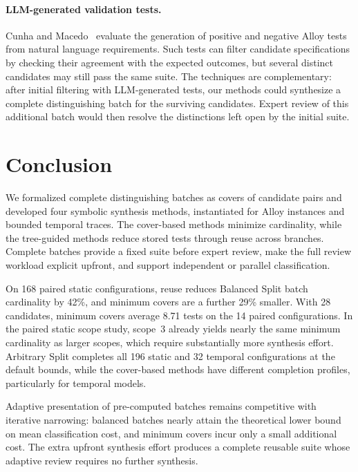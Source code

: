 \documentclass[runningheads]{llncs}
\newcommand{\methodname}[1]{\textup{\textsf{#1}}}
\newcommand{\arbitrarysplit}{\methodname{Arbitrary Split}}
\newcommand{\balancedsplit}{\methodname{Balanced Split}}
\begin{document}
\paragraph{LLM-generated validation tests.}
Cunha and Macedo~\cite{cunha2025validatingformalspecificationsllmgenerated}
evaluate the generation of positive and negative Alloy tests from natural
language requirements. Such tests can filter candidate specifications by
checking their agreement with the expected outcomes, but several distinct
candidates may still pass the same suite. The techniques are complementary:
after initial filtering with LLM-generated tests, our methods could synthesize
a complete distinguishing batch for the surviving candidates. Expert review
of this additional batch would then resolve the distinctions left open by the
initial suite.

\section{Conclusion}
\label{sec:conclusion}

We formalized complete distinguishing batches as covers of candidate pairs
and developed four symbolic synthesis methods, instantiated for Alloy
instances and bounded temporal traces. The cover-based methods minimize
cardinality, while the tree-guided methods reduce stored tests through reuse
across branches. Complete batches provide a fixed suite before expert review,
make the full review workload explicit upfront, and support independent or
parallel classification.

On 168 paired static configurations, reuse reduces \balancedsplit{} batch
cardinality by 42\%, and minimum covers are a further 29\% smaller. With 28
candidates, minimum covers average 8.71 tests on the 14 paired configurations.
In the paired static scope study, scope~3 already yields nearly the same
minimum cardinality as larger scopes, which require substantially more
synthesis effort. \arbitrarysplit{} completes all 196 static and 32 temporal
configurations at the default bounds, while the cover-based methods have
different completion profiles, particularly for temporal models.

Adaptive presentation of pre-computed batches remains competitive with iterative narrowing: balanced
batches nearly attain the theoretical lower bound on mean classification
cost, and minimum covers incur only a small additional cost. The extra
upfront synthesis effort produces a complete reusable suite whose adaptive
review requires no further synthesis.
\end{document}
